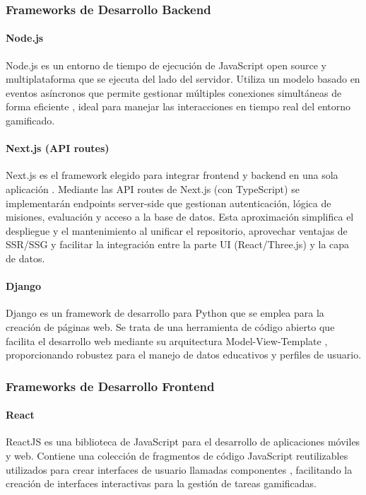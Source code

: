 \subsubsection{Frameworks de Desarrollo Backend}

\paragraph{Node.js}
Node.js es un entorno de tiempo de ejecución de JavaScript open source y multiplataforma que se ejecuta del lado del servidor. Utiliza un modelo basado en eventos asíncronos que permite gestionar múltiples conexiones simultáneas de forma eficiente \cite{acibeiro2022}, ideal para manejar las interacciones en tiempo real del entorno gamificado.

\paragraph{Next.js (API routes)}
Next.js es el framework elegido para integrar frontend y backend en una sola aplicación \cite{nextjs_docs2024}. Mediante las API routes de Next.js (con TypeScript) se implementarán endpoints server-side que gestionan autenticación, lógica de misiones, evaluación y acceso a la base de datos. Esta aproximación simplifica el despliegue y el mantenimiento al unificar el repositorio, aprovechar ventajas de SSR/SSG y facilitar la integración entre la parte UI (React/Three.js) y la capa de datos.

\paragraph{Django}
Django es un framework de desarrollo para Python que se emplea para la creación de páginas web. Se trata de una herramienta de código abierto que facilita el desarrollo web mediante su arquitectura Model-View-Template \cite{fernandez2022}, proporcionando robustez para el manejo de datos educativos y perfiles de usuario.

\subsubsection{Frameworks de Desarrollo Frontend}

\paragraph{React}
ReactJS es una biblioteca de JavaScript para el desarrollo de aplicaciones móviles y web. Contiene una colección de fragmentos de código JavaScript reutilizables utilizados para crear interfaces de usuario llamadas componentes \cite{deyimar2023}, facilitando la creación de interfaces interactivas para la gestión de tareas gamificadas.

